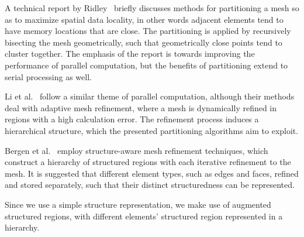 A technical report by Ridley~\cite{ridley2010guide} briefly discusses methods for partitioning a mesh so as to maximize spatial data locality, in other words adjacent elements tend to have memory locations that are close. The partitioning is applied by recursively bisecting the mesh geometrically, such that geometrically close points tend to cluster together. The emphasis of the report is towards improving the performance of parallel computation, but the benefits of partitioning extend to serial processing as well.




Li et al.~\cite{li2004hierarchical} follow a similar theme of parallel computation, although their methods deal with adaptive mesh refinement, where a mesh is dynamically refined in regions with a high calculation error. The refinement process induces a hierarchical structure, which the presented partitioning algorithms aim to exploit.




Bergen et al.~\cite{bergen2004hierarchical} employ structure-aware mesh refinement techniques, which construct a hierarchy of structured regions with each iterative refinement to the mesh. It is suggested that different element types, such as edges and faces, refined and stored separately, such that their distinct structuredness can be represented.

Since we use a simple structure representation, we make use of augmented structured regions, with different elements' structured region represented in a hierarchy.



